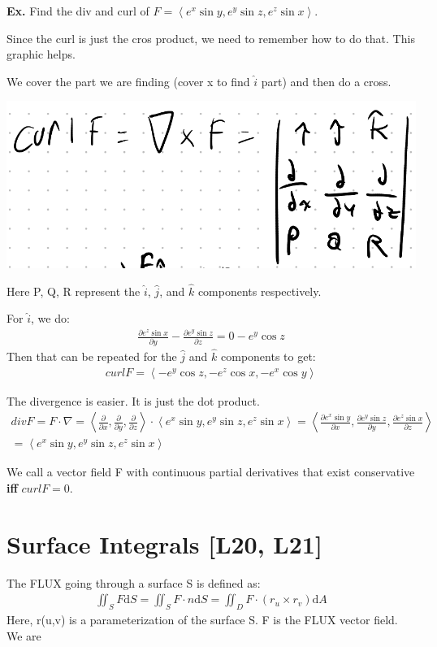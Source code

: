 \documentclass[12pt,letterpaper]{article} \usepackage{amsmath} \usepackage{graphicx} \usepackage[margin=1in]{geometry} \usepackage{longtable}  \usepackage{amssymb}
\begin{document}
	\begin{mdframed}[]
	\textbf{Ex. } Find the div and curl of $F=\left<e^x \sin y, e^y \sin z, e^z \sin x\right>$.
	
	Since the curl is just the cros product, we need to remember how to do that. This graphic helps. 
	
	We cover the part we are finding (cover x to find $\hat{i}$ part) and then do a cross. 
	\begin{center}
		\includegraphics[width=0.4\linewidth]{"cross product"}
	\end{center}
	Here P, Q, R represent the $\hat{i}$, $\hat{j}$, and $\hat{k}$ components respectively.
	
	For $\hat{i}$, we do:
	\begin{align*}
		\frac{\partial e^z \sin x}{\partial y} - \frac{\partial e^y \sin z}{\partial z} = 0 - e^y \cos z
	\end{align*}	
	Then that can be repeated for the $\hat{j}$ and $\hat{k}$ components to get:
	\begin{align*}
		curl F = \left<-e^y \cos z, -e^z \cos x, -e^x \cos y\right>
	\end{align*}

	The divergence is easier. It is just the dot product. 
	\begin{align*}
		div F = F \cdot \nabla = \left<\frac{\partial }{\partial x}, \frac{\partial }{\partial y}, \frac{\partial }{\partial z}\right> \cdot \left<e^x \sin y, e^y \sin z, e^z \sin x\right> = \left<\frac{\partial e^x \sin y}{\partial x}, \frac{\partial  e^y \sin z}{\partial y}, \frac{\partial  e^z \sin x}{\partial z}\right> \\
		=  \left<e^x \sin y, e^y \sin z, e^z \sin x\right>
	\end{align*}
	\end{mdframed}

	We call a vector field F with continuous partial derivatives that exist conservative \textbf{iff} $curl F = 0$.
	
	\section{Surface Integrals [L20, L21]}
	The FLUX going through a surface S is defined as:
	\begin{align*}
		\iint_S F \mathrm{d}S = \iint_S F \cdot n \mathrm{d}S = \iint_D F \cdot (r_u \times r_v) \mathrm{d}A
	\end{align*}
	Here, r(u,v) is a parameterization of the surface S. F is the FLUX vector field. We are 
	
\end{document}
